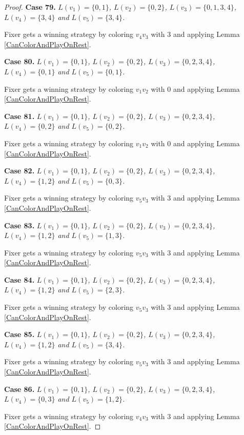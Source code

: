\documentclass[12pt]{amsart}
\theoremstyle{plain}
\theoremstyle{definition}
\theoremstyle{remark}
\begin{document}
\begin{proof}
\noindent\textbf{Case 79.  }\textit{$L(v_1) = \{0, 1\}$, $L(v_2) = \{0, 2\}$, $L(v_3) = \{0, 1, 3, 4\}$, $L(v_4) = \{3, 4\}$ and $L(v_5) = \{3, 4\}$.}

Fixer gets a winning strategy by coloring $v_4v_3$ with $3$ and applying Lemma \ref{CanColorAndPlayOnRest}.

\noindent\textbf{Case 80.  }\textit{$L(v_1) = \{0, 1\}$, $L(v_2) = \{0, 2\}$, $L(v_3) = \{0, 2, 3, 4\}$, $L(v_4) = \{0, 1\}$ and $L(v_5) = \{0, 1\}$.}

Fixer gets a winning strategy by coloring $v_1v_2$ with $0$ and applying Lemma \ref{CanColorAndPlayOnRest}.

\noindent\textbf{Case 81.  }\textit{$L(v_1) = \{0, 1\}$, $L(v_2) = \{0, 2\}$, $L(v_3) = \{0, 2, 3, 4\}$, $L(v_4) = \{0, 2\}$ and $L(v_5) = \{0, 2\}$.}

Fixer gets a winning strategy by coloring $v_1v_2$ with $0$ and applying Lemma \ref{CanColorAndPlayOnRest}.

\noindent\textbf{Case 82.  }\textit{$L(v_1) = \{0, 1\}$, $L(v_2) = \{0, 2\}$, $L(v_3) = \{0, 2, 3, 4\}$, $L(v_4) = \{1, 2\}$ and $L(v_5) = \{0, 3\}$.}

Fixer gets a winning strategy by coloring $v_5v_3$ with $3$ and applying Lemma \ref{CanColorAndPlayOnRest}.

\noindent\textbf{Case 83.  }\textit{$L(v_1) = \{0, 1\}$, $L(v_2) = \{0, 2\}$, $L(v_3) = \{0, 2, 3, 4\}$, $L(v_4) = \{1, 2\}$ and $L(v_5) = \{1, 3\}$.}

Fixer gets a winning strategy by coloring $v_5v_3$ with $3$ and applying Lemma \ref{CanColorAndPlayOnRest}.

\noindent\textbf{Case 84.  }\textit{$L(v_1) = \{0, 1\}$, $L(v_2) = \{0, 2\}$, $L(v_3) = \{0, 2, 3, 4\}$, $L(v_4) = \{1, 2\}$ and $L(v_5) = \{2, 3\}$.}

Fixer gets a winning strategy by coloring $v_5v_3$ with $3$ and applying Lemma \ref{CanColorAndPlayOnRest}.

\noindent\textbf{Case 85.  }\textit{$L(v_1) = \{0, 1\}$, $L(v_2) = \{0, 2\}$, $L(v_3) = \{0, 2, 3, 4\}$, $L(v_4) = \{1, 2\}$ and $L(v_5) = \{3, 4\}$.}

Fixer gets a winning strategy by coloring $v_5v_3$ with $3$ and applying Lemma \ref{CanColorAndPlayOnRest}.

\noindent\textbf{Case 86.  }\textit{$L(v_1) = \{0, 1\}$, $L(v_2) = \{0, 2\}$, $L(v_3) = \{0, 2, 3, 4\}$, $L(v_4) = \{0, 3\}$ and $L(v_5) = \{1, 2\}$.}

Fixer gets a winning strategy by coloring $v_4v_3$ with $3$ and applying Lemma \ref{CanColorAndPlayOnRest}.


\end{proof}
\end{document}
